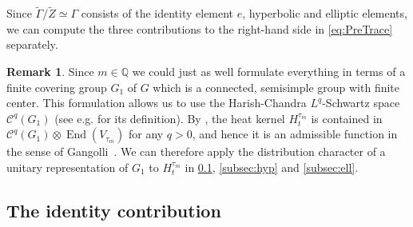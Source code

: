 \documentclass[JEP,XML,SOM,Unicode,NoFloatCountersInSection,published]{cedram}
\theoremstyle{plain}
\theoremstyle{definition}
\newtheorem{rmrk}[thm]{Remark}
\theoremstyle{remark}
\newcommand{\Q}{\mathbb{Q}}
\DeclareMathOperator{\End}{End}
\numberwithin{equation}{section}
\begin{document}
Since $\widetilde{\Gamma}/\widetilde{Z}\simeq\Gamma$ consists of the identity element $e$, hyperbolic and elliptic elements, we can compute the three contributions to the right-hand side in \cref{eq:PreTrace} separately.

\begin{rmrk}
Since $m\in\Q$ we could just as well formulate everything in terms of a finite covering group $G_1$ of $G$ which is a connected, semisimple group with finite center. This formulation allows us to use the Harish-Chandra $L^q$-Schwartz space $\mathcal{C}^q(G_1)$ (see e.g. \cite[p.\,161--162]{BM} for its definition). By \cite[Lem.\,2.3 and Prop.\,2.4]{BM}, the heat kernel $H_t^{\tau_m}$ is contained in $\mathcal{C}^q(G_1)\otimes\End(V_{\tau_m})$ for any $q>0$, and hence it is an admissible function in the sense of Gangolli~\cite[p.\,407]{gangolli1977}. We can therefore apply the distribution character of a unitary representation of $G_1$ to $H_t^{\tau_m}$ in \cref{subsec:id}, \cref{subsec:hyp} and \cref{subsec:ell}.
\end{rmrk}

\subsection{The identity contribution}
\label{subsec:id}
\end{document}
